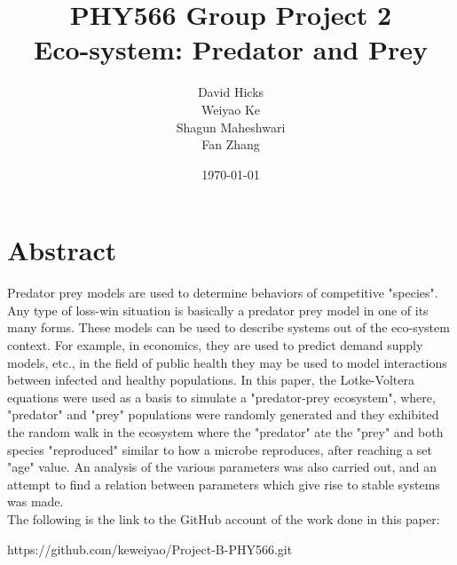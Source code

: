 \documentclass[a4paper,12pt]{article}
\begin{document}
\title{PHY566 Group Project 2 \\ 
	Eco-system: Predator and Prey}
\date{\today}
\author{David Hicks\\ Weiyao Ke \\ Shagun Maheshwari \\ Fan Zhang}

\maketitle
\section{Abstract}
Predator prey models are used to determine behaviors of competitive "species". Any type of loss-win situation is basically a predator prey model in one of its many forms.
These models can be used to describe systems out of the eco-system context. For example, in economics, they are used to predict demand supply models, etc., in the field of public health they may be used to model interactions between infected and healthy populations.
In this paper, the Lotke-Voltera equations were used as a basis to simulate a "predator-prey ecosystem", where, "predator" and "prey" populations were randomly generated and they exhibited the random walk in the ecosystem where the "predator" ate the "prey" and both species "reproduced" similar to how a microbe reproduces, after reaching a set "age" value.
An analysis of the various parameters was also carried out, and an attempt to find a relation between parameters which give rise to stable systems was made.\\ 

The following is the link to the GitHub account of the work done in this paper: \\
\begin{center}
https://github.com/keweiyao/Project-B-PHY566.git
\end{center}
\end{document}
